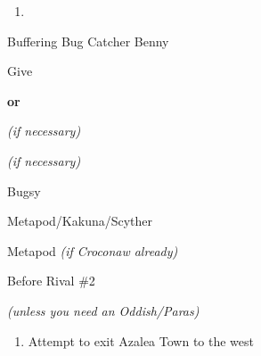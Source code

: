 \begin{paracol}{2}
\switchcolumn
\vspace{-0.4pc}
\begin{enumerate}[resume]
	\item {}
\end{enumerate}
\vspace{-0.25pc}

\begin{menu}{Buffering Bug Catcher Benny}
	\varwb
	\begin{packMenu}
		\item \textbf{\przCureBerry{}} \pointRight{} Give 
		\item \potion{} \textbf{or} \superPotion{}
		\small{\item \textbf{\antidote{}} \emphasis{\poison{}} \textit{(if necessary)}}
		\small{\item \textbf{\paralyzeHeal{}} \emphasis{\paralyze{}} \textit{(if necessary)}}
	\end{packMenu}
	\varwe
\end{menu}

\begin{boss}{Bugsy}
	\varwb
	\begin{fightSection}{Metapod/Kakuna/Scyther}
		\item {} \rage{}
		\begin{notes}
			\small{\item {} \waterGun{} Metapod  \textit{(if Croconaw already)}}
		\end{notes}
	\end{fightSection}
	\varwe
\end{boss}

\begin{menu}{Before Rival \#2}
	\varwb
	\begin{packMenu}
		\item \superPotion
		\item \repel{} \textit{(unless you need an Oddish/Paras)}
		\item \menuHlTwo{(\pointLeft{})}  \furyCutter{} \switch{} \rage{} \menuHlTwo{(1)}
	\end{packMenu}
	\varwe
\end{menu}

\begin{enumerate}[resume]
	\item Attempt to exit Azalea Town to the west
\end{enumerate}


\end{paracol}
